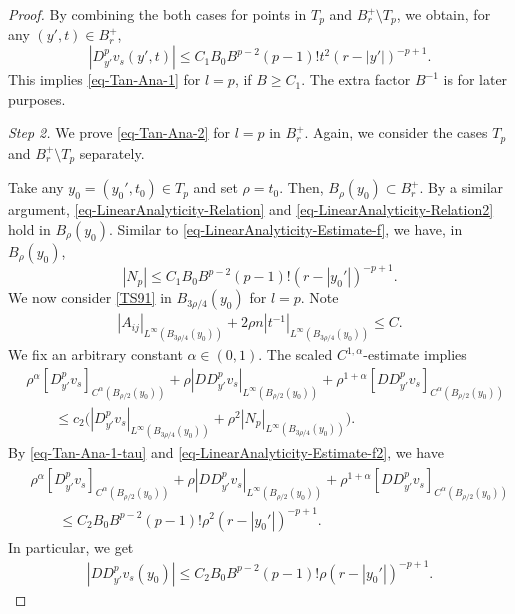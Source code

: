 \documentclass[11pt,reqno]{amsart}
\renewcommand{\leq}{\leqslant}
\renewcommand{\geq}{\geqslant}
\theoremstyle{definition}
\numberwithin{equation}{section}
\begin{document}
\begin{proof}
By combining the both cases for points in $T_p$ and $B^+_r\setminus T_p$, 
we obtain, for any $(y', t)\in B^+_r$, 
\begin{equation}\label{eq-Tan-Ana-1-tau}
|D^p_{y'} v_s(y',t)|\leq C_1 B_0B^{p-2}(p-1)! t^2(r-|y'|)^{-p+1}.\end{equation}
This implies \eqref{eq-Tan-Ana-1} for $l=p$, if $B\geq  C_1$. 
The extra factor $B^{-1}$ is for later purposes. 


\smallskip

{\it Step 2.} We prove \eqref{eq-Tan-Ana-2} for $l=p$ in $B^+_r$. Again, we consider 
the cases $T_p$ and $B^+_r\setminus T_p$ separately.

Take any $y_0=(y_0', t_0)\in T_p$ and set $\rho=t_0$. Then, $B_\rho(y_0)\subset B^+_r$. 
By a similar argument, \eqref{eq-LinearAnalyticity-Relation}
and \eqref{eq-LinearAnalyticity-Relation2} hold in $B_\rho(y_0)$. Similar to 
\eqref{eq-LinearAnalyticity-Estimate-f}, we have, in $B_\rho(y_0)$,  
\begin{equation}\label{eq-LinearAnalyticity-Estimate-f2}
|N_p|
\leq C_1 B_0B^{p-2}(p-1)!(r-|y_0'|)^{-p+1}.
\end{equation}
We now consider \eqref{TS91} in $B_{3\rho/4}(y_0)$ for $l=p$. 
Note 
\begin{align}|A_{ij}|_{L^\infty(B_{3\rho/4}(y_0))}
+2\rho n\left|t^{-1}\right|_{L^\infty(B_{3\rho/4}(y_0))}
\leq C.\end{align}
We  fix an arbitrary constant $\alpha\in(0,1)$. 
The scaled $C^{1,\alpha}$-estimate implies 
\begin{align} &\rho^{\alpha}[D_{y'}^pv_s]_{C^\alpha(B_{\rho/2}(y_0))}
+\rho|DD_{y'}^pv_s|_{L^\infty(B_{\rho/2}(y_0))}
+\rho^{1+\alpha}[DD_{y'}^pv_s]_{C^\alpha(B_{\rho/2}(y_0))}\\
&\qquad \leq c_2\big(|D_{y'}^pv_s|_{L^\infty(B_{3\rho/4}(y_0))}+\rho^2|N_p|_{L^\infty(B_{3\rho/4}(y_0))}\big).
\end{align}
By \eqref{eq-Tan-Ana-1-tau} and 
\eqref{eq-LinearAnalyticity-Estimate-f2}, we have 
\begin{align}\label{eq-LinearAnalyticity-Estimate-u}\begin{split}
&\rho^{\alpha}[D_{y'}^pv_s]_{C^\alpha(B_{\rho/2}(y_0))}
+\rho|DD_{y'}^pv_s|_{L^\infty(B_{\rho/2}(y_0))}
+\rho^{1+\alpha}[DD_{y'}^pv_s]_{C^\alpha(B_{\rho/2}(y_0))}\\
&\qquad \leq C_2 B_0B^{p-2}(p-1)!\rho^2(r-|y_0'|)^{-p+1}.
\end{split}\end{align}
In particular, we get 
\begin{align}|DD_{y'}^pv_s(y_0)|\leq C_2  B_0B^{p-2}(p-1)!\rho(r-|y_0'|)^{-p+1}.\end{align}


\end{proof}
\end{document}
